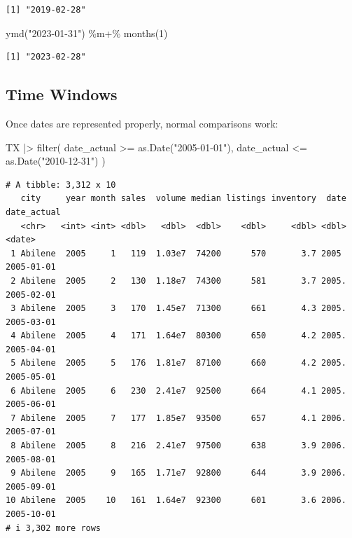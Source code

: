 \documentclass[
  letterpaper,
  DIV=11,
  numbers=noendperiod]{scrreprt}
\newenvironment{Shaded}{\begin{snugshade}}{\end{snugshade}}
\newcommand{\DecValTok}[1]{\textcolor[rgb]{0.68,0.00,0.00}{#1}}
\newcommand{\FunctionTok}[1]{\textcolor[rgb]{0.28,0.35,0.67}{#1}}
\newcommand{\NormalTok}[1]{\textcolor[rgb]{0.00,0.23,0.31}{#1}}
\newcommand{\SpecialCharTok}[1]{\textcolor[rgb]{0.37,0.37,0.37}{#1}}
\newcommand{\StringTok}[1]{\textcolor[rgb]{0.13,0.47,0.30}{#1}}
\begin{document}
\begin{verbatim}
[1] "2019-02-28"
\end{verbatim}

\begin{Shaded}
\begin{Highlighting}[]
\FunctionTok{ymd}\NormalTok{(}\StringTok{"2023{-}01{-}31"}\NormalTok{) }\SpecialCharTok{\%m+\%} \FunctionTok{months}\NormalTok{(}\DecValTok{1}\NormalTok{)}
\end{Highlighting}
\end{Shaded}

\begin{verbatim}
[1] "2023-02-28"
\end{verbatim}

\subsection{Time Windows}\label{time-windows}

Once dates are represented properly, normal comparisons work:

\begin{Shaded}
\begin{Highlighting}[]
\NormalTok{TX }\SpecialCharTok{|\textgreater{}}
    \FunctionTok{filter}\NormalTok{(}
\NormalTok{        date\_actual }\SpecialCharTok{\textgreater{}=} \FunctionTok{as.Date}\NormalTok{(}\StringTok{"2005{-}01{-}01"}\NormalTok{),}
\NormalTok{        date\_actual }\SpecialCharTok{\textless{}=} \FunctionTok{as.Date}\NormalTok{(}\StringTok{"2010{-}12{-}31"}\NormalTok{)}
\NormalTok{    )}
\end{Highlighting}
\end{Shaded}

\begin{verbatim}
# A tibble: 3,312 x 10
   city     year month sales  volume median listings inventory  date date_actual
   <chr>   <int> <int> <dbl>   <dbl>  <dbl>    <dbl>     <dbl> <dbl> <date>     
 1 Abilene  2005     1   119  1.03e7  74200      570       3.7 2005  2005-01-01 
 2 Abilene  2005     2   130  1.18e7  74300      581       3.7 2005. 2005-02-01 
 3 Abilene  2005     3   170  1.45e7  71300      661       4.3 2005. 2005-03-01 
 4 Abilene  2005     4   171  1.64e7  80300      650       4.2 2005. 2005-04-01 
 5 Abilene  2005     5   176  1.81e7  87100      660       4.2 2005. 2005-05-01 
 6 Abilene  2005     6   230  2.41e7  92500      664       4.1 2005. 2005-06-01 
 7 Abilene  2005     7   177  1.85e7  93500      657       4.1 2006. 2005-07-01 
 8 Abilene  2005     8   216  2.41e7  97500      638       3.9 2006. 2005-08-01 
 9 Abilene  2005     9   165  1.71e7  92800      644       3.9 2006. 2005-09-01 
10 Abilene  2005    10   161  1.64e7  92300      601       3.6 2006. 2005-10-01 
# i 3,302 more rows
\end{verbatim}
\end{document}
